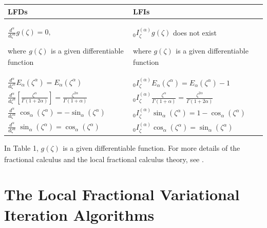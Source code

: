 \documentclass[10pt]{NSP1}
\begin{document}
\begin{table}[htbp]
\begin{center}
\begin{tabular}{|p{180pt}|p{158pt}|}
\hline
LFDs&
LFIs \\
\hline
$\frac{d^\alpha }{d\zeta ^\alpha }g\left( \zeta \right)=0,$
\par where
$_{ }g\left( \zeta \right)_{ }$ is a given differentiable function &
${ }_0I_\zeta ^{\left( \alpha \right)}g\left( \zeta \right)$ does not exist
\par where $g\left( \zeta \right)_{ }$ is a given differentiable function \\
\hline
$\frac{d^\alpha }{d\zeta ^\alpha }E_\alpha \left( {\zeta ^\alpha } \right)
=E_\alpha \left( {\zeta ^\alpha } \right)$ &
${ }_0I_\zeta ^{\left( \alpha \right)}E_\alpha \left( {\zeta ^\alpha }
\right)=E_\alpha \left( {\zeta ^\alpha } \right)-1$ \\
\hline
$\frac{d^\alpha }{d\zeta ^\alpha }\left[ {\frac{\zeta ^\alpha }
{\Gamma \left( {1+2\alpha } \right)}} \right]=\frac{\zeta ^{2\alpha }}
{\Gamma \left( {1+\alpha } \right)}$ &
${ }_0I_\zeta ^{\left( \alpha \right)}\frac{\zeta ^\alpha }{\Gamma \left( {1+\alpha } \right)}
=\frac{\zeta ^{2\alpha }}{\Gamma \left( {1+2\alpha } \right)}$ \\
\hline
$\frac{d^\alpha}{d\zeta ^\alpha }\; \cos _\alpha \left( {\zeta ^\alpha } \right)
=-\sin _\alpha \left( {\zeta ^\alpha } \right)$ &
${ }_0I_\zeta ^{\left( \alpha \right)}\sin _\alpha \left( {\zeta ^\alpha }
\right)=1-\cos _\alpha \left( {\zeta ^\alpha } \right)$ \\
\hline
$\frac{d^\alpha}{d\zeta ^\alpha}\;
\sin _\alpha \left( {\zeta ^\alpha } \right)
=\cos _\alpha \left( {\zeta ^\alpha } \right)$ &
${ }_0I_\zeta ^{\left( \alpha \right)}\cos _\alpha \left( {\zeta ^\alpha }
\right)=\sin _\alpha \left( {\zeta ^\alpha } \right)$ \\
\hline
\end{tabular}
\label{tab1}
\end{center}
\end{table}

In Table 1, $g\left( \zeta \right)_{ }$ is a given differentiable function.
For more details of the fractional calculus and the local fractional calculus theory,
see \cite {22,23,35,36,37,38,39,40,41,42,43,44,45}.\\

\vskip 2mm

\section{\; The Local Fractional Variational Iteration Algorithms}
\end{document}
